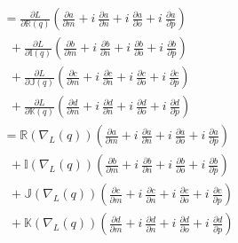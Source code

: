 \documentclass[14pt,a4paper]{article}
\begin{document}
\begin{align}
&= \frac{\partial L}{\partial \mathbb{R}(q)} \left( \frac{\partial a}{\partial m} + \textit{i}~\frac{\partial a}{\partial n} + \textit{i}~\frac{\partial a}{\partial o} + \textit{i}~\frac{\partial a}{\partial p} \right) \\ \nonumber
&~~+ \frac{\partial L}{\partial \mathbb{I}(q)} \left( \frac{\partial b}{\partial m} + \textit{i}~\frac{\partial b}{\partial n} + \textit{i}~\frac{\partial b}{\partial o} + \textit{i}~\frac{\partial b}{\partial p} \right) \\ \nonumber
&~~+ \frac{\partial L}{\partial \mathbb{J}(q)} \left( \frac{\partial c}{\partial m} + \textit{i}~\frac{\partial c}{\partial n} + \textit{i}~\frac{\partial c}{\partial o} + \textit{i}~\frac{\partial c}{\partial p} \right) \\ \nonumber
&~~+ \frac{\partial L}{\partial \mathbb{K}(q)} \left( \frac{\partial d}{\partial m} + \textit{i}~\frac{\partial d}{\partial n} + \textit{i}~\frac{\partial d}{\partial o} + \textit{i}~\frac{\partial d}{\partial p} \right) \\ \nonumber
&= \mathbb{R}(\nabla_L(q)) \left( \frac{\partial a}{\partial m} + \textit{i}~\frac{\partial a}{\partial n} + \textit{i}~\frac{\partial a}{\partial o} + \textit{i}~\frac{\partial a}{\partial p} \right) \\ \nonumber
&~~+ \mathbb{I}(\nabla_L(q)) \left( \frac{\partial b}{\partial m} + \textit{i}~\frac{\partial b}{\partial n} + \textit{i}~\frac{\partial b}{\partial o} + \textit{i}~\frac{\partial b}{\partial p} \right) \\ \nonumber
&~~+ \mathbb{J}(\nabla_L(q)) \left( \frac{\partial c}{\partial m} + \textit{i}~\frac{\partial c}{\partial n} + \textit{i}~\frac{\partial c}{\partial o} + \textit{i}~\frac{\partial c}{\partial p} \right) \\ \nonumber
&~~+ \mathbb{K}(\nabla_L(q)) \left( \frac{\partial d}{\partial m} + \textit{i}~\frac{\partial d}{\partial n} + \textit{i}~\frac{\partial d}{\partial o} + \textit{i}~\frac{\partial d}{\partial p} \right)
\label{eq:diff2}
\end{align}
\end{document}
